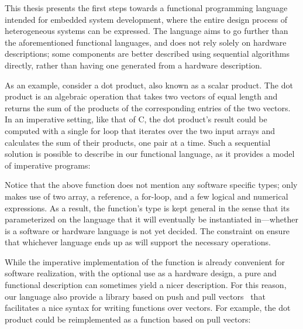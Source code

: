 \documentclass[../main.tex]{subfiles}
\begin{document}
This thesis presents the first steps towards a functional programming language intended for embedded system development, where the entire design process of heterogeneous systems can be expressed. The language aims to go further than the aforementioned functional languages, and does not rely solely on hardware descriptions; some components are better described using sequential algorithms directly, rather than having one generated from a hardware description.

As an example, consider a dot product, also known as a scalar product. The dot product is an algebraic operation that takes two vectors of equal length and returns the sum of the products of the corresponding entries of the two vectors. In an imperative setting, like that of C, the dot product's result could be computed with a single for loop that iterates over the two input arrays and calculates the sum of their products, one pair at a time. Such a sequential solution is possible to describe in our functional language, as it provides a model of imperative programs:


Notice that the above  function does not mention any software specific types;  only makes use of two array, a reference, a for-loop, and a few logical and numerical expressions. As a result, the function's type is kept general in the sense that its parameterized on the language  that it will eventually be instantiated in---whether  is a software or hardware language is not yet decided. The constraint  on  ensure that whichever language  ends up as will support the necessary operations.

While the imperative implementation of the  function is already convenient for software realization, with the optional use as a hardware design, a pure and functional description can sometimes yield a nicer description. For this reason, our language also provide a library based on push and pull vectors~\cite{claessen2012} that facilitates a nice syntax for writing functions over vectors. For example, the dot product could be reimplemented as a function based on pull vectors:
\end{document}
